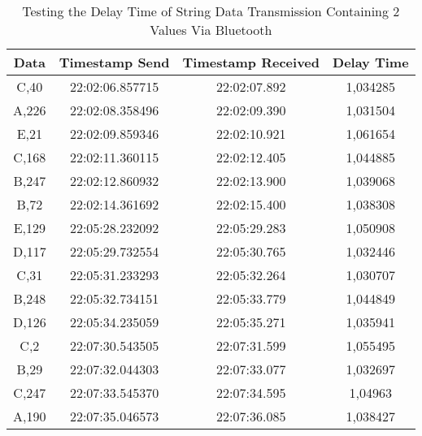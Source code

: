 \begin{table}[!ht]
\centering
  \caption{Testing the Delay Time of String Data Transmission Containing 2 Values Via Bluetooth}
  \label{tbl:delayBluetooth}
  \begin{tabular}{|ccc|c|}
  \hline
  \multicolumn{1}{|c|}{Data}  & \multicolumn{1}{c|}{Timestamp Send}  & Timestamp Received & Delay Time  \\ \hline
  \multicolumn{1}{|c|}{C,40}  & \multicolumn{1}{c|}{22:02:06.857715} & 22:02:07.892       & 1,034285    \\ \hline
  \multicolumn{1}{|c|}{A,226} & \multicolumn{1}{c|}{22:02:08.358496} & 22:02:09.390       & 1,031504    \\ \hline
  \multicolumn{1}{|c|}{E,21}  & \multicolumn{1}{c|}{22:02:09.859346} & 22:02:10.921       & 1,061654    \\ \hline
  \multicolumn{1}{|c|}{C,168} & \multicolumn{1}{c|}{22:02:11.360115} & 22:02:12.405       & 1,044885    \\ \hline
  \multicolumn{1}{|c|}{B,247} & \multicolumn{1}{c|}{22:02:12.860932} & 22:02:13.900       & 1,039068    \\ \hline
  \multicolumn{1}{|c|}{B,72}  & \multicolumn{1}{c|}{22:02:14.361692} & 22:02:15.400       & 1,038308    \\ \hline
  \multicolumn{1}{|c|}{E,129} & \multicolumn{1}{c|}{22:05:28.232092} & 22:05:29.283       & 1,050908    \\ \hline
  \multicolumn{1}{|c|}{D,117} & \multicolumn{1}{c|}{22:05:29.732554} & 22:05:30.765       & 1,032446    \\ \hline
  \multicolumn{1}{|c|}{C,31}  & \multicolumn{1}{c|}{22:05:31.233293} & 22:05:32.264       & 1,030707    \\ \hline
  \multicolumn{1}{|c|}{B,248} & \multicolumn{1}{c|}{22:05:32.734151} & 22:05:33.779       & 1,044849    \\ \hline
  \multicolumn{1}{|c|}{D,126} & \multicolumn{1}{c|}{22:05:34.235059} & 22:05:35.271       & 1,035941    \\ \hline
  \multicolumn{1}{|c|}{C,2}   & \multicolumn{1}{c|}{22:07:30.543505} & 22:07:31.599       & 1,055495    \\ \hline
  \multicolumn{1}{|c|}{B,29}  & \multicolumn{1}{c|}{22:07:32.044303} & 22:07:33.077       & 1,032697    \\ \hline
  \multicolumn{1}{|c|}{C,247} & \multicolumn{1}{c|}{22:07:33.545370} & 22:07:34.595       & 1,04963     \\ \hline
  \multicolumn{1}{|c|}{A,190} & \multicolumn{1}{c|}{22:07:35.046573} & 22:07:36.085       & 1,038427    \\ \hline

\end{tabular}
\end{table}
